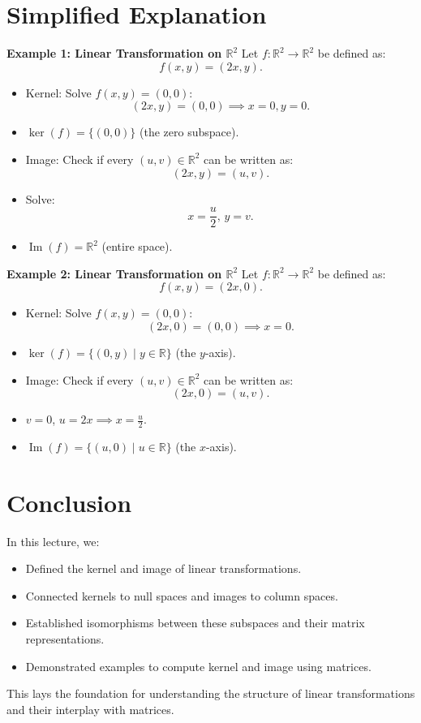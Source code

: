 \documentclass{article}
\begin{document}
\section*{Simplified Explanation}

\textbf{Example 1: Linear Transformation on $\mathbb{R}^2$}
Let $f: \mathbb{R}^2 \to \mathbb{R}^2$ be defined as:
\[
  f(x, y) = (2x, y).
\]
\begin{itemize}
  \item Kernel: Solve $f(x, y) = (0, 0)$:
    \[
      (2x, y) = (0, 0) \implies x = 0, y = 0.
    \]
  \item $\ker(f) = \{(0, 0)\}$ (the zero subspace).
  \item Image: Check if every $(u, v) \in \mathbb{R}^2$ can be written as:
    \[
      (2x, y) = (u, v).
    \]
  \item Solve:
    \[
      x = \frac{u}{2}, \, y = v.
    \]
  \item $\operatorname{Im}(f) = \mathbb{R}^2$ (entire space).
\end{itemize}

\textbf{Example 2: Linear Transformation on $\mathbb{R}^2$}
Let $f: \mathbb{R}^2 \to \mathbb{R}^2$ be defined as:
\[
  f(x, y) = (2x, 0).
\]
\begin{itemize}
  \item Kernel: Solve $f(x, y) = (0, 0)$:
    \[
      (2x, 0) = (0, 0) \implies x = 0.
    \]
  \item $\ker(f) = \{(0, y) \mid y \in \mathbb{R}\}$ (the $y$-axis).
  \item Image: Check if every $(u, v) \in \mathbb{R}^2$ can be written as:
    \[
      (2x, 0) = (u, v).
    \]
  \item $v = 0$, $u = 2x \implies x = \frac{u}{2}$.
  \item $\operatorname{Im}(f) = \{(u, 0) \mid u \in \mathbb{R}\}$ (the $x$-axis).
\end{itemize}

\section*{Conclusion}

In this lecture, we:
\begin{itemize}
  \item Defined the kernel and image of linear transformations.
  \item Connected kernels to null spaces and images to column spaces.
  \item Established isomorphisms between these subspaces and their matrix representations.
  \item Demonstrated examples to compute kernel and image using matrices.
\end{itemize}

This lays the foundation for understanding the structure of linear transformations and their interplay with matrices.
\end{document}

